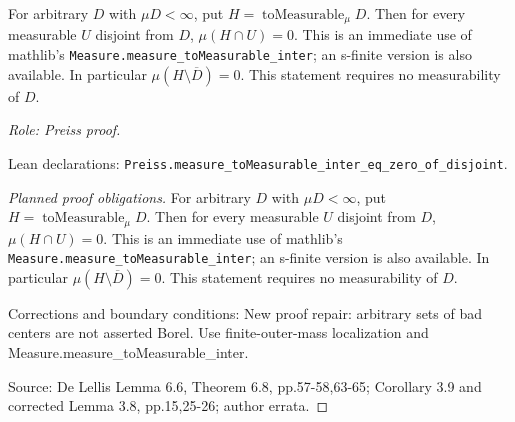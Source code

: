 \begin{lemma}
\label{lem:measurable-hull-holes}







For arbitrary $D$ with $\mu D<\infty$, put $H=\operatorname{toMeasurable}_\mu D$.
Then for every measurable $U$ disjoint from $D$, $\mu(H\cap U)=0$.
This is an immediate use of mathlib's
\texttt{Measure.measure\_toMeasurable\_inter}; an s-finite version is also
available. In particular $\mu(H\setminus\overline D)=0$.
This statement requires no measurability of $D$.
\par\emph{Role: Preiss proof.}
\par Lean declarations: \texttt{Preiss.measure\_toMeasurable\_inter\_eq\_zero\_of\_disjoint}.
\end{lemma}
\begin{proof}[Planned proof obligations]

For arbitrary $D$ with $\mu D<\infty$, put $H=\operatorname{toMeasurable}_\mu D$.
Then for every measurable $U$ disjoint from $D$, $\mu(H\cap U)=0$.
This is an immediate use of mathlib's
\texttt{Measure.measure\_toMeasurable\_inter}; an s-finite version is also
available. In particular $\mu(H\setminus\overline D)=0$.
This statement requires no measurability of $D$.
\par Corrections and boundary conditions: New proof repair: arbitrary sets of bad centers are not asserted Borel. Use finite-outer-mass localization and Measure.measure\_toMeasurable\_inter.
\par Source: De Lellis Lemma 6.6, Theorem 6.8, pp.57-58,63-65; Corollary 3.9 and corrected Lemma 3.8, pp.15,25-26; author errata.
\end{proof}

